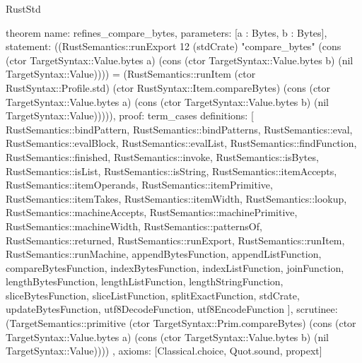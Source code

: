 \begin{lexlean}{RustStd}
\begin{semanticmodule}
theorem{
  name: refines_compare_bytes,
  parameters: [a : Bytes, b : Bytes],
  statement: ((RustSemantics::runExport 12 (stdCrate) "compare_bytes" (cons (ctor TargetSyntax::Value.bytes a) (cons (ctor TargetSyntax::Value.bytes b) (nil TargetSyntax::Value)))) = (RustSemantics::runItem (ctor RustSyntax::Profile.std) (ctor RustSyntax::Item.compareBytes) (cons (ctor TargetSyntax::Value.bytes a) (cons (ctor TargetSyntax::Value.bytes b) (nil TargetSyntax::Value))))),
  proof: term_cases{
    definitions: [
      RustSemantics::bindPattern,
      RustSemantics::bindPatterns,
      RustSemantics::eval,
      RustSemantics::evalBlock,
      RustSemantics::evalList,
      RustSemantics::findFunction,
      RustSemantics::finished,
      RustSemantics::invoke,
      RustSemantics::isBytes,
      RustSemantics::isList,
      RustSemantics::isString,
      RustSemantics::itemAccepts,
      RustSemantics::itemOperands,
      RustSemantics::itemPrimitive,
      RustSemantics::itemTakes,
      RustSemantics::itemWidth,
      RustSemantics::lookup,
      RustSemantics::machineAccepts,
      RustSemantics::machinePrimitive,
      RustSemantics::machineWidth,
      RustSemantics::patternsOf,
      RustSemantics::returned,
      RustSemantics::runExport,
      RustSemantics::runItem,
      RustSemantics::runMachine,
      appendBytesFunction,
      appendListFunction,
      compareBytesFunction,
      indexBytesFunction,
      indexListFunction,
      joinFunction,
      lengthBytesFunction,
      lengthListFunction,
      lengthStringFunction,
      sliceBytesFunction,
      sliceListFunction,
      splitExactFunction,
      stdCrate,
      updateBytesFunction,
      utf8DecodeFunction,
      utf8EncodeFunction
    ],
    scrutinee: (TargetSemantics::primitive (ctor TargetSyntax::Prim.compareBytes) (cons (ctor TargetSyntax::Value.bytes a) (cons (ctor TargetSyntax::Value.bytes b) (nil TargetSyntax::Value))))
  },
  axioms: [Classical.choice, Quot.sound, propext]
}


\end{semanticmodule}
\end{lexlean}
